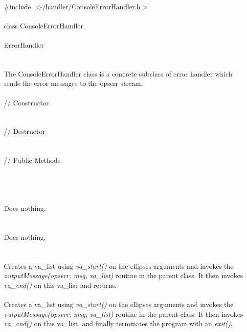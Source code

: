 
   \\
\indent \#include $<\tilde{ }$/handler/ConsoleErrorHandler.h$>$  \\

  \\
\indent class ConsoleErrorHandler \\

 \\
\indent ErrorHandler \\
\indent{} \\

  \\
\indent The ConsoleErrorHandler class is a concrete subclass of error
handler which sends the error messages to the opserr stream. \\

 \\
\indent // Constructor \\
\\ \\
\indent // Destructor \\
\\ \\
\indent // Public Methods  \\
\\
\\ 

  \\
  \\ 
Does nothing.\\

 \\
\\ 
Does nothing. \\

  \\
\\
Creates a va\_list using {\em va\_start()} on the ellipses arguments
and invokes the {\em outputMessage(opserr, msg, va\_list)} routine in
the parent class. It then invokes  {\em va\_end()} on this va\_list
and returns.\\ 

\\
Creates a va\_list using {\em va\_start()} on the ellipses arguments
and invokes the {\em outputMessage(opserr, msg, va\_list)} routine in
the parent class. It then invokes {\em va\_end()} on this va\_list,
and finally terminates the program with an {\em exit()}. 
